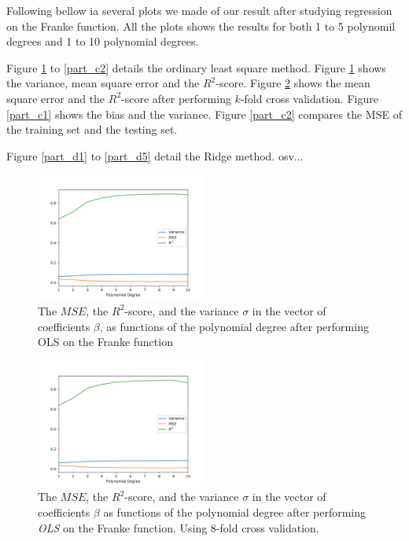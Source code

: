 \documentclass[a4paper,10pt,english]{article}
\begin{document}
Following bellow ia several plots we made of our result after studying regression on the Franke function. All the plots shows the results for both 1 to 5 polynomil degrees and 1 to 10 polynomial degrees. %

Figure \ref{part_a} to \ref{part_c2} details the ordinary least square method.
Figure \ref{part_a} shows the variance, mean square error and the $R^2$-score.
Figure \ref{part_b} shows the mean square error and the $R^2$-score after performing $k$-fold cross validation. 
Figure \ref{part_c1} shows the bias and the variance. 
Figure \ref{part_c2} compares the MSE of the training set and the testing set.

Figure \ref{part_d1} to \ref{part_d5} detail the Ridge method.
osv...


\begin{figure}[H]
	\centering  
	\includegraphics[width = 0.5\textwidth, center]{../franke_output/part_A.png}
	\caption{The $MSE$, the $R^2$-score, and the variance $\sigma$ in the vector of coefficients $\beta$, as functions of the polynomial degree after performing OLS on the Franke function}
	\label{part_a}
\end{figure}

\begin{figure}[H]
	\centering 
	\includegraphics[width = 0.5\textwidth, center]{../franke_output/part_B.png}
	\caption{The $MSE$, the $R^2$-score, and the variance $\sigma$ in the vector of coefficients $\beta$ as functions of the polynomial degree after performing \textit{OLS} on the Franke function.  Using $8$-fold cross validation.}
	\label{part_b}
\end{figure}
\end{document}
